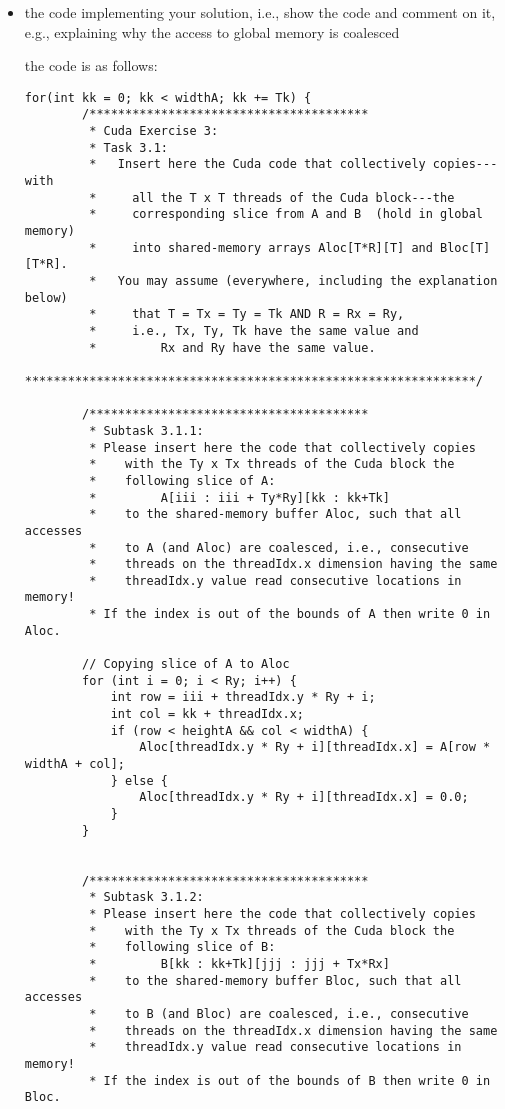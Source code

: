 \documentclass{article}
\begin{document}
\begin{itemize}
    \item the code implementing your solution, i.e., show the code and comment on it,
    e.g., explaining why the access to global memory is coalesced

    the code is as follows:

    \begin{lstlisting}[language=cuda]
    for(int kk = 0; kk < widthA; kk += Tk) {
        /***************************************
         * Cuda Exercise 3:
         * Task 3.1:
         *   Insert here the Cuda code that collectively copies---with 
         *     all the T x T threads of the Cuda block---the
         *     corresponding slice from A and B  (hold in global memory)
         *     into shared-memory arrays Aloc[T*R][T] and Bloc[T][T*R].
         *   You may assume (everywhere, including the explanation below)
         *     that T = Tx = Ty = Tk AND R = Rx = Ry,
         *     i.e., Tx, Ty, Tk have the same value and 
         *         Rx and Ry have the same value.
         ***************************************************************/
  
        /***************************************
         * Subtask 3.1.1:
         * Please insert here the code that collectively copies 
         *    with the Ty x Tx threads of the Cuda block the 
         *    following slice of A: 
         *         A[iii : iii + Ty*Ry][kk : kk+Tk] 
         *    to the shared-memory buffer Aloc, such that all accesses 
         *    to A (and Aloc) are coalesced, i.e., consecutive
         *    threads on the threadIdx.x dimension having the same
         *    threadIdx.y value read consecutive locations in memory!
         * If the index is out of the bounds of A then write 0 in Aloc.
  
        // Copying slice of A to Aloc
        for (int i = 0; i < Ry; i++) {
            int row = iii + threadIdx.y * Ry + i;
            int col = kk + threadIdx.x;
            if (row < heightA && col < widthA) {
                Aloc[threadIdx.y * Ry + i][threadIdx.x] = A[row * widthA + col];
            } else {
                Aloc[threadIdx.y * Ry + i][threadIdx.x] = 0.0;
            }
        }
  
  
        /***************************************
         * Subtask 3.1.2:
         * Please insert here the code that collectively copies 
         *    with the Ty x Tx threads of the Cuda block the
         *    following slice of B: 
         *         B[kk : kk+Tk][jjj : jjj + Tx*Rx] 
         *    to the shared-memory buffer Bloc, such that all accesses 
         *    to B (and Bloc) are coalesced, i.e., consecutive
         *    threads on the threadIdx.x dimension having the same
         *    threadIdx.y value read consecutive locations in memory!
         * If the index is out of the bounds of B then write 0 in Bloc.
         

\end{lstlisting}
\end{itemize}
\end{document}
